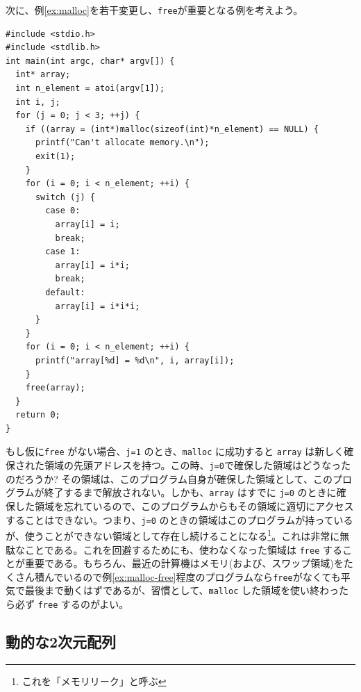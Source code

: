 次に、例\ref{ex:malloc}を若干変更し、\verb|free|が重要となる例を考えよう。
\begin{reidai}\label{ex:malloc-free}
\begin{verbatim}
#include <stdio.h>
#include <stdlib.h>
int main(int argc, char* argv[]) {
  int* array;
  int n_element = atoi(argv[1]);
  int i, j;
  for (j = 0; j < 3; ++j) {
    if ((array = (int*)malloc(sizeof(int)*n_element) == NULL) {
      printf("Can't allocate memory.\n");
      exit(1);
    }
    for (i = 0; i < n_element; ++i) {
      switch (j) {
        case 0:
          array[i] = i;
          break;
        case 1:
          array[i] = i*i;
          break;
        default:
          array[i] = i*i*i;
      }
    }
    for (i = 0; i < n_element; ++i) {
      printf("array[%d] = %d\n", i, array[i]);
    }
    free(array);
  }
  return 0;
}
\end{verbatim}
\end{reidai} \noindent
もし仮に\verb|free| がない場合、\verb|j=1| のとき、\verb|malloc| に成功すると \verb|array| は新しく確保された領域の先頭アドレスを持つ。この時、\verb|j=0|で確保した領域はどうなったのだろうか? その領域は、このプログラム自身が確保した領域として、このプログラムが終了するまで解放されない。しかも、\verb|array| はすでに \verb|j=0| のときに確保した領域を忘れているので、このプログラムからもその領域に適切にアクセスすることはできない。つまり、\verb|j=0| のときの領域はこのプログラムが持っているが、使うことができない領域として存在し続けることになる\footnote{これを「メモリリーク」と呼ぶ}。これは非常に無駄なことである。これを回避するためにも、使わなくなった領域は \verb|free| することが重要である。もちろん、最近の計算機はメモリ(および、スワップ領域)をたくさん積んでいるので例\ref{ex:malloc-free}程度のプログラムなら\verb|free|がなくても平気で最後まで動くはずであるが、習慣として、\verb|malloc| した領域を使い終わったら必ず \verb|free| するのがよい。

\subsection{動的な2次元配列}

